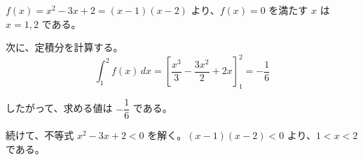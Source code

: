 \documentclass[paper=a4]{jlreq}
\begin{document}

$f(x) = x^2 - 3x + 2 = (x-1)(x-2)$ より、$f(x) = 0$ を満たす $x$ は $x = 1, 2$ である。

次に、定積分を計算する。
\[
  \int_{1}^{2} f(x)\,dx
  = \left[ \frac{x^3}{3} - \frac{3x^2}{2} + 2x \right]_{1}^{2}
  = -\frac{1}{6}
\]

したがって、求める値は $-\dfrac{1}{6}$ である。

\newpage

続けて、不等式 $x^2 - 3x + 2 < 0$ を解く。$(x-1)(x-2) < 0$ より、$1 < x < 2$ である。
\end{document}
